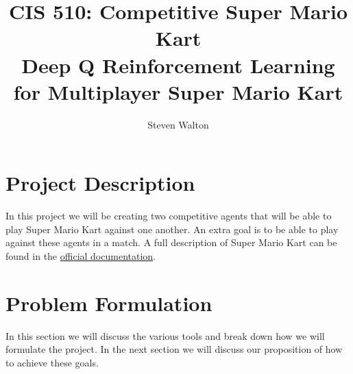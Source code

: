 \documentclass[12pt,letter]{article}
\begin{document}
\title{CIS 510: Competitive Super Mario Kart\\
\large Deep Q Reinforcement Learning for Multiplayer Super Mario Kart}
\author{Steven Walton}
\maketitle

\section{Project Description}
In this project we will be creating two competitive agents that will be able to
play Super Mario Kart against one another. An extra goal is to be able to play
against these agents in a match. A full description of Super Mario Kart can be
found in the \href{https://www.nintendo.co.jp/clvs/manuals/common/pdf/CLV-P-SAAFE.pdf}
{official documentation}.

\section{Problem Formulation}
In this section we will discuss the various tools and break down how we will
formulate the project. In the next section we will discuss our proposition of
how to achieve these goals.
\end{document}
